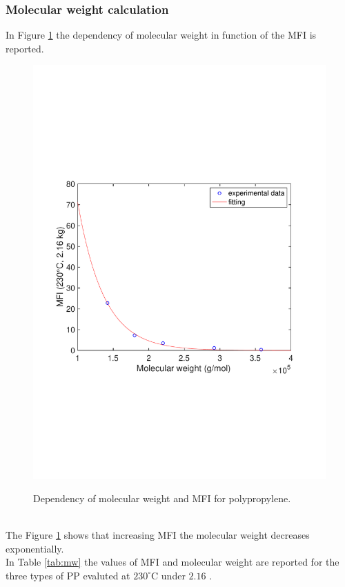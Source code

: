 \documentclass[a4paper, 11pt]{article}
\begin{document}
\subsubsection{Molecular weight calculation}

In Figure \ref{fig:mw} the dependency of molecular weight in function of the MFI is reported.
\begin{figure}[h!]
	\centering
	{\includegraphics[scale=0.4]{mw}}
	\captionsetup{justification=centering}
	\caption{Dependency of molecular weight and MFI for polypropylene.}
	\label{fig:mw}
\end{figure}\\
The Figure \ref{fig:mw} shows that increasing MFI the molecular weight decreases exponentially.\\ In Table \ref{tab:mw} the values of MFI and molecular weight are reported for the three types of PP evaluted at $230 ^\circ$C under $2.16$ .
\end{document}
